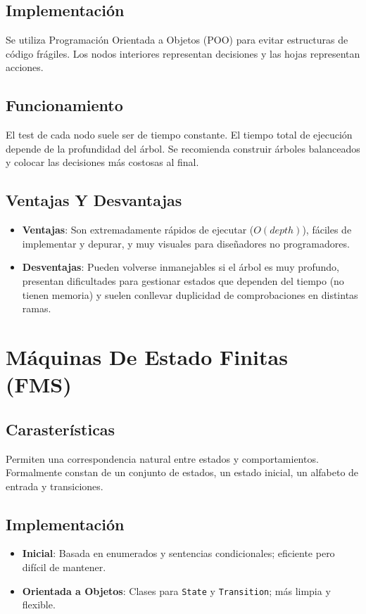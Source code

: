 \subsection{Implementación}
Se utiliza Programación Orientada a Objetos (POO) para evitar estructuras de código frágiles. Los nodos interiores representan decisiones y las hojas representan acciones.

\subsection{Funcionamiento}
El test de cada nodo suele ser de tiempo constante. El tiempo total de ejecución depende de la profundidad del árbol. Se recomienda construir árboles balanceados y colocar las decisiones más costosas al final.

\subsection{Ventajas Y Desvantajas}
\begin{itemize}
    \item \textbf{Ventajas}: Son extremadamente rápidos de ejecutar ($O(depth)$), fáciles de implementar y depurar, y muy visuales para diseñadores no programadores.
    \item \textbf{Desventajas}: Pueden volverse inmanejables si el árbol es muy profundo, presentan dificultades para gestionar estados que dependen del tiempo (no tienen memoria) y suelen conllevar duplicidad de comprobaciones en distintas ramas.
\end{itemize}

\section{Máquinas De Estado Finitas (FMS)}
\subsection{Carasterísticas}
Permiten una correspondencia natural entre estados y comportamientos. Formalmente constan de un conjunto de estados, un estado inicial, un alfabeto de entrada y transiciones.

\subsection{Implementación}
\begin{itemize}
    \item \textbf{Inicial}: Basada en enumerados y sentencias condicionales; eficiente pero difícil de mantener.
    \item \textbf{Orientada a Objetos}: Clases para \texttt{State} y \texttt{Transition}; más limpia y flexible.
\end{itemize}

